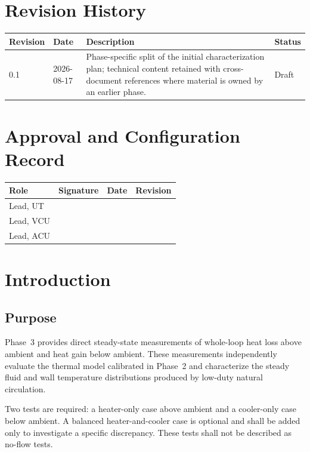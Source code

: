 \documentclass[11pt]{article}
\begin{document}
\clearpage
{}
\section*{Revision History}
\begin{tabularx}{\textwidth}{@{}p{0.75in}p{1.2in}>{\raggedright\arraybackslash}X>{\raggedright\arraybackslash}p{1.15in}@{}}
\toprule
\textbf{Revision} & \textbf{Date} & \textbf{Description} & \textbf{Status} \\
\midrule
0.1 & 2026-08-17 & Phase-specific split of the initial characterization plan; technical content retained with cross-document references where material is owned by an earlier phase. & Draft \\
\bottomrule
\end{tabularx}

\vspace{0.25in}
\section*{Approval and Configuration Record}
\begin{tabularx}{\textwidth}{@{}p{1.55in}X p{1.25in}p{1.05in}@{}}
\toprule
\textbf{Role} & \textbf{Signature} & \textbf{Date} & \textbf{Revision} \\
\midrule
Lead, UT & & & \\
Lead, VCU & & & \\
Lead, ACU & & & \\
\bottomrule
\end{tabularx}
\clearpage
\tableofcontents
\clearpage
{}

\section{Introduction}
\label{sec:introduction}
\subsection{Purpose}
Phase~3 provides direct steady-state measurements of whole-loop heat loss above ambient and heat gain below ambient. These measurements independently evaluate the thermal model calibrated in Phase~2 and characterize the steady fluid and wall temperature distributions produced by low-duty natural circulation.

Two tests are required: a heater-only case above ambient and a cooler-only case below ambient. A balanced heater-and-cooler case is optional and shall be added only to investigate a specific discrepancy. These tests shall not be described as no-flow tests.
\end{document}
